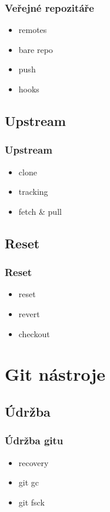 \documentclass[pdftex]{beamer}
\begin{document}
\begin{frame}
	\frametitle{Veřejné repozitáře}
	\begin{itemize}
		\item remotes
		\item bare repo
		\item push
		\item hooks
	\end{itemize}
\end{frame}

\subsection{Upstream}

\begin{frame}
	\frametitle{Upstream}
	\begin{itemize}
		\item clone
		\item tracking
		\item fetch \& pull
	\end{itemize}
\end{frame}

\subsection{Reset}

\begin{frame}
	\frametitle{Reset}
	\begin{itemize}
		\item reset
		\item revert
		\item checkout
	\end{itemize}
\end{frame}

\section{Git nástroje}

\subsection{Údržba}

\begin{frame}
	\frametitle{Údržba gitu}
	\begin{itemize}
		\item recovery
		\item git gc
		\item git fsck
	\end{itemize}
\end{frame}
\end{document}
